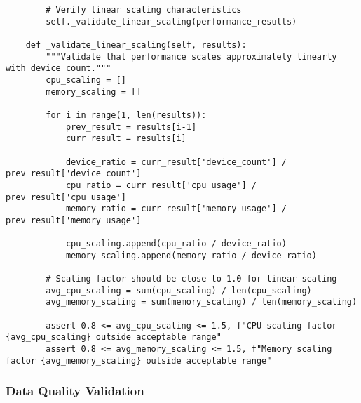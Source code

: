 \documentclass[12pt,a4paper]{article}
\begin{document}
\begin{verbatim}
        # Verify linear scaling characteristics
        self._validate_linear_scaling(performance_results)
    
    def _validate_linear_scaling(self, results):
        """Validate that performance scales approximately linearly with device count."""
        cpu_scaling = []
        memory_scaling = []
        
        for i in range(1, len(results)):
            prev_result = results[i-1]
            curr_result = results[i]
            
            device_ratio = curr_result['device_count'] / prev_result['device_count']
            cpu_ratio = curr_result['cpu_usage'] / prev_result['cpu_usage']
            memory_ratio = curr_result['memory_usage'] / prev_result['memory_usage']
            
            cpu_scaling.append(cpu_ratio / device_ratio)
            memory_scaling.append(memory_ratio / device_ratio)
        
        # Scaling factor should be close to 1.0 for linear scaling
        avg_cpu_scaling = sum(cpu_scaling) / len(cpu_scaling)
        avg_memory_scaling = sum(memory_scaling) / len(memory_scaling)
        
        assert 0.8 <= avg_cpu_scaling <= 1.5, f"CPU scaling factor {avg_cpu_scaling} outside acceptable range"
        assert 0.8 <= avg_memory_scaling <= 1.5, f"Memory scaling factor {avg_memory_scaling} outside acceptable range"
\end{verbatim}

\subsubsection{Data Quality Validation}
\end{document}
